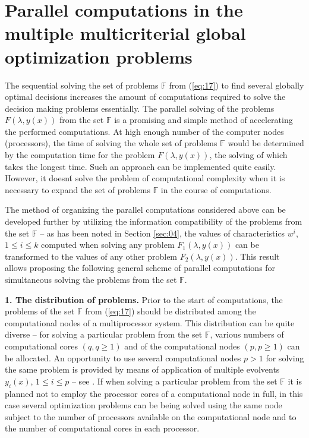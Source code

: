 \documentclass{svproc}
\begin{document}
\section{Parallel computations in the multiple multicriterial global optimization problems} 
\label{sec:05}

The sequential solving the set of problems $\mathbb{F}$ from (\ref{eq:17}) to find several globally optimal decisions increases the amount of computations required to solve the decision making problems essentially. The parallel solving of the problems $F(\lambda,y(x))$ from the set $\mathbb{F}$ is a promising and simple method of accelerating the performed computations. At high enough number of the computer nodes (processors), the time of solving the whole set of problems $\mathbb{F}$ would be determined by the computation time for the problem $F(\lambda,y(x))$, the solving of which takes the longest time. Such an approach can be implemented quite easily. However, it doesn\'t solve the problem of computational complexity when it is necessary to expand the set of problems $\mathbb{F}$ in the course of computations.

The method of organizing the parallel computations considered above can be developed further by utilizing the information compatibility of the problems from the set $\mathbb{F}$ -- as has been noted in Section {\ref{sec:04}}, the values of characteristics $w^i$, $1 \leq i \leq k$ computed when solving any problem $F_1(\lambda,y(x))$ can be transformed to the values of any other problem $F_2(\lambda,y(x))$. This result allows proposing the following general scheme of parallel computations for simultaneous solving the problems from the set $\mathbb{F}$.

\textbf{1. The distribution of problems.} Prior to the start of computations, the problems of the set $\mathbb{F}$ from (\ref{eq:17}) should be distributed among the computational nodes of a multiprocessor system. This distribution can be quite diverse -- for solving a particular problem from the set $\mathbb{F}$, various numbers of computational cores $(q, q \geq 1)$ and of the computational nodes $(p, p \geq 1)$ can be allocated. An opportunity to use several computational nodes $p>1$ for solving the same problem is provided by means of application of multiple evolvents $y_i (x)$, $1\leq i\leq p$ -- see \cite{x13,x14}. If when solving a particular problem from the set $\mathbb{F}$ it is planned not to employ the processor cores of a computational node in full, in this case several optimization problems can be being solved using the same node subject to the number of processors available on the computational node and to the number of computational cores in each processor. 
\end{document}
